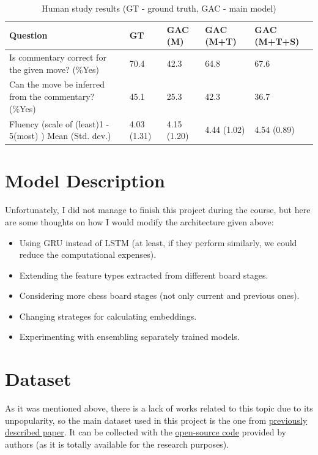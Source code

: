 \documentclass{article}
\begin{document}
\begin{table}
\centering
\begin{tabular}{|p{3cm}|p{1cm}|p{1cm}|p{1cm}|p{1.5cm}|}
\hline
\textbf{Question} & \textbf{GT} & \textbf{GAC
(M)} & \textbf{GAC
(M+T)} & \textbf{GAC
(M+T+S)} \\
\hline
Is commentary correct for the given move? (\%Yes) & 70.4 & 42.3 & 64.8 & 67.6 \\ 
\hline
Can the move be inferred from the commentary? (\%Yes) & 45.1 & 25.3 & 42.3 & 36.7 \\
\hline
Fluency (scale of (least)1 - 5(most) ) Mean (Std. dev.) & 4.03 (1.31) & 4.15 (1.20) & 4.44 (1.02) & 4.54 (0.89) \\
\hline
\end{tabular}
\caption{Human study results (GT - ground truth, GAC - main model)}
\label{table:4}
\end{table}


\section{Model Description}

Unfortunately, I did not manage to finish this project during the course, but here are some thoughts on how I would modify the architecture given above: 

\begin{itemize}
\item Using GRU instead of LSTM (at least, if they perform similarly, we could reduce the computational expenses).
\item Extending the feature types extracted from different board stages.
\item Considering more chess board stages (not only current and previous ones).
\item Changing strateges for calculating embeddings.
\item Experimenting with ensembling separately trained models.
\end{itemize}


\section{Dataset}
As it was mentioned above, there is a lack of works related to this topic due to its unpopularity, so the main dataset used in this project is the one from \href{https://aclanthology.org/P18-1154/}{previously described paper}. It can be collected with the \href{https://github.com/harsh19/ChessCommentaryGeneration/tree/master}{open-source code}\cite{jhamtani2018acl} provided by authors (as it is totally available for the research purposes).
\end{document}
